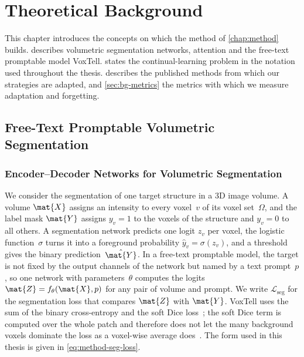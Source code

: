 %

\chapter{Theoretical Background}
\label{chap:background}

This chapter introduces the concepts on which the method of \cref{chap:method} builds.
 describes volumetric segmentation networks, attention and the free-text promptable model VoxTell.
 states the continual-learning problem in the notation used throughout the thesis.
 describes the published methods from which our strategies are adapted, and \cref{sec:bg-metrics} the metrics with which we measure adaptation and forgetting.

\section{Free-Text Promptable Volumetric Segmentation}
\label{sec:bg-segmentation}

\subsection{Encoder--Decoder Networks for Volumetric Segmentation}
\label{subsec:bg-unet}

We consider the segmentation of one target structure in a 3D image volume.
A volume $\mat{X}$ assigns an intensity to every voxel~$v$ of its voxel set~$\Omega$, and the label mask $\mat{Y}$ assigns $y_v = 1$ to the voxels of the structure and $y_v = 0$ to all others.
A segmentation network predicts one logit $z_v$ per voxel, the logistic function~$\sigma$ turns it into a foreground probability $\hat{y}_v = \sigma(z_v)$, and a threshold gives the binary prediction~$\hat{\mat{Y}}$.
In a free-text promptable model, the target is not fixed by the output channels of the network but named by a text prompt~$p$, so one network with parameters~$\theta$ computes the logits $\mat{Z} = f_\theta(\mat{X}, p)$ for any pair of volume and prompt.
We write $\mathcal{L}_{\mathrm{seg}}$ for the segmentation loss that compares $\mat{Z}$ with $\mat{Y}$.
VoxTell uses the sum of the binary cross-entropy and the soft Dice loss~\cite[Sec.~3]{rokuss2025voxtellfreetextpromptableuniversal}; the soft Dice term is computed over the whole patch and therefore does not let the many background voxels dominate the loss as a voxel-wise average does~\cite{milletari2016vnet}.
The form used in this thesis is given in \cref{eq:method-seg-loss}.

